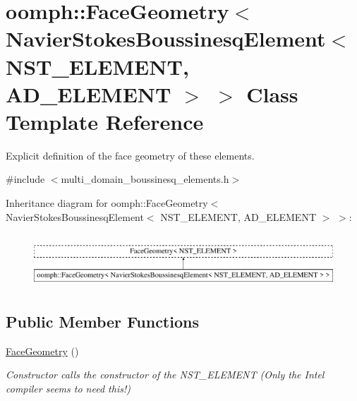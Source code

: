 \hypertarget{classoomph_1_1FaceGeometry_3_01NavierStokesBoussinesqElement_3_01NST__ELEMENT_00_01AD__ELEMENT_01_4_01_4}{}\section{oomph\+:\+:Face\+Geometry$<$ Navier\+Stokes\+Boussinesq\+Element$<$ N\+S\+T\+\_\+\+E\+L\+E\+M\+E\+NT, A\+D\+\_\+\+E\+L\+E\+M\+E\+NT $>$ $>$ Class Template Reference}
\label{classoomph_1_1FaceGeometry_3_01NavierStokesBoussinesqElement_3_01NST__ELEMENT_00_01AD__ELEMENT_01_4_01_4}


Explicit definition of the face geometry of these elements.  




{\ttfamily \#include $<$multi\+\_\+domain\+\_\+boussinesq\+\_\+elements.\+h$>$}

Inheritance diagram for oomph\+:\+:Face\+Geometry$<$ Navier\+Stokes\+Boussinesq\+Element$<$ N\+S\+T\+\_\+\+E\+L\+E\+M\+E\+NT, A\+D\+\_\+\+E\+L\+E\+M\+E\+NT $>$ $>$\+:\begin{figure}[H]
\begin{center}
\leavevmode
\includegraphics[height=2.000000cm]{classoomph_1_1FaceGeometry_3_01NavierStokesBoussinesqElement_3_01NST__ELEMENT_00_01AD__ELEMENT_01_4_01_4}
\end{center}
\end{figure}
\subsection*{Public Member Functions}
\begin{DoxyCompactItemize}
\item 
\hyperlink{classoomph_1_1FaceGeometry_3_01NavierStokesBoussinesqElement_3_01NST__ELEMENT_00_01AD__ELEMENT_01_4_01_4_ae0a1b0af8c4a6d31491fcc01dc6041a9}{Face\+Geometry} ()
\begin{DoxyCompactList}\small\item\em Constructor calls the constructor of the N\+S\+T\+\_\+\+E\+L\+E\+M\+E\+NT (Only the Intel compiler seems to need this!) \end{DoxyCompactList}\end{DoxyCompactItemize}


